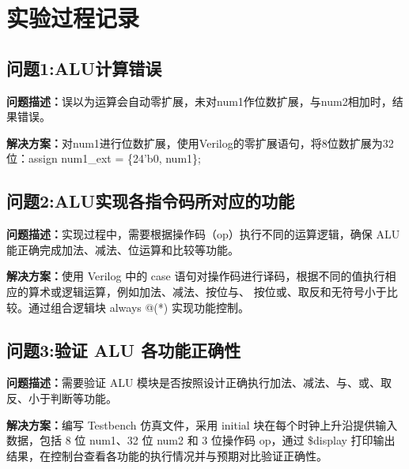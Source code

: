 \section{实验过程记录}

\subsection{问题1:ALU计算错误}
\textbf{问题描述：}误以为运算会自动零扩展，未对num1作位数扩展，与num2相加时，结果错误。

\textbf{解决方案：}对num1进行位数扩展，使用Verilog的零扩展语句，将8位数扩展为32位：assign num1\_ext = \{24'b0, num1\};
\subsection{问题2:ALU实现各指令码所对应的功能}
\textbf{问题描述：}实现过程中，需要根据操作码（op）执行不同的运算逻辑，确保 ALU 能正确完成加法、减法、位运算和比较等功能。

\textbf{解决方案：}使用 Verilog 中的 case 语句对操作码进行译码，根据不同的值执行相应的算术或逻辑运算，例如加法、减法、按位与、
按位或、取反和无符号小于比较。通过组合逻辑块 always @(*) 实现功能控制。
\subsection{问题3:验证 ALU 各功能正确性}
\textbf{问题描述：}需要验证 ALU 模块是否按照设计正确执行加法、减法、与、或、取反、小于判断等功能。

\textbf{解决方案：}编写 Testbench 仿真文件，采用 initial 块在每个时钟上升沿提供输入数据，包括 8 位 num1、32 位 num2
 和 3 位操作码 op，通过 \$display 打印输出结果，在控制台查看各功能的执行情况并与预期对比验证正确性。
